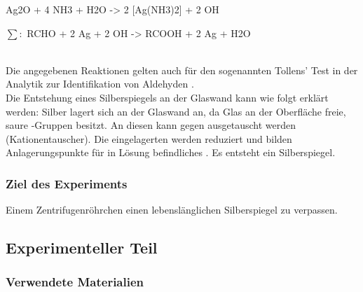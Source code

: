 \documentclass{article}
\begin{document}
        \begin{reaction}
          Ag2O\sld{} + 4 NH3\sld{} + H2O -> 2 [Ag(NH3)2]\pch\aq{} + 2 OH\mch\aq \\
        \end{reaction}
        
        \begin{reactions}
          $\sum :$ RCHO\aq{} + 2 Ag\pch\aq{} + 2 OH\mch\aq{} -> RCOOH\aq{} + 2 Ag\sld{} + H2O
        \end{reactions} \\
        
        Die angegebenen Reaktionen gelten auch für den sogenannten Tollens' Test in der Analytik zur Identifikation von Aldehyden \cite{Tollenstest}. \\
        
        Die Entstehung eines Silberspiegels an der Glaswand kann wie folgt erklärt werden: Silber lagert sich an der Glaswand an, da Glas an der Oberfläche freie, saure -Gruppen besitzt. An diesen kann  gegen  ausgetauscht werden (Kationentauscher). Die eingelagerten  werden reduziert und bilden Anlagerungspunkte für in Lösung befindliches .  Es entsteht ein Silberspiegel.
      
      \subsubsection{Ziel des Experiments}
      
        Einem Zentrifugenröhrchen einen lebenslänglichen Silberspiegel zu verpassen.
    
    \subsection{Experimenteller Teil}
    
      \subsubsection{Verwendete Materialien}
        
\end{document}
